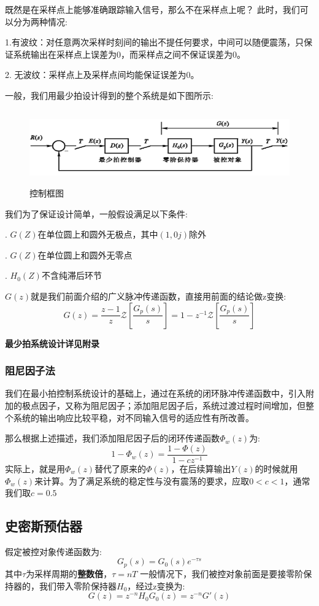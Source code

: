 \documentclass[12pt, a4paper, oneside]{ctexbook}
\begin{document}
既然是在采样点上能够准确跟踪输入信号，那么不在采样点上呢？
此时，我们可以分为两种情况:

1.有波纹：对任意两次采样时刻间的输出不提任何要求，中间可以随便震荡，只保证系统输出在采样点上误差为0，而采样点之间不保证误差为0。

2. 无波纹：采样点上及采样点间均能保证误差为0。

\noindent 一般，我们用最少拍设计得到的整个系统是如下图所示:
\begin{figure}[htbp]
	\centering
	\includegraphics[width=14cm,height=3.2cm]{img/6_1.png}
	\caption{控制框图}
\end{figure}
\noindent 我们为了保证设计简单，一般假设满足以下条件:

. $G(Z)$在单位圆上和圆外无极点，其中$(1,0j)$除外

. $G(Z)$在单位圆上和圆外无零点

. $H_0(Z)$不含纯滞后环节

$G(z)$就是我们前面介绍的广义脉冲传递函数，直接用前面的结论做z变换:
$$
G(z)=\frac{z-1}{z}\mathcal Z[\frac{G_p(s)}{s}] = 1-z^{-1}\mathcal Z[\frac{G_p(s)}{s}]
$$

\textbf{最少拍系统设计详见附录}
\subsubsection{阻尼因子法}
我们在最小拍控制系统设计的基础上，通过在系统的闭环脉冲传递函数中，引入附加的极点因子，又称为阻尼因子；添加阻尼因子后，系统过渡过程时间增加，但整个系统的输出响应比较平稳，对不同输入信号的适应性有所改善。

那么根据上述描述，我们添加阻尼因子后的闭环传递函数$\varPhi_w(z)$为:
$$
1-\varPhi_w(z)=\frac{1-\varPhi(z)}{1-cz^{-1}}
$$
实际上，就是用$\varPhi_w(z)$替代了原来的$\varPhi(z)$，在后续算输出$Y(z)$的时候就用$\varPhi_w(z)$来计算。为了满足系统的稳定性与没有震荡的要求，应取$0<c<1$，通常我们取$c=0.5$
\subsection{史密斯预估器}
假定被控对象传递函数为:
$$
G_p(s)=G_0(s)e^{-\tau s}
$$
其中$\tau$为采样周期的\textbf{整数倍}，$\tau=nT$
一般情况下，我们被控对象前面是要接零阶保持器的，我们带入零阶保持器$H_0$，经过z变换为:
$$
G(z)=z^{-n}H_0G_0(z)=z^{-n}G'(z)
$$
\end{document}
